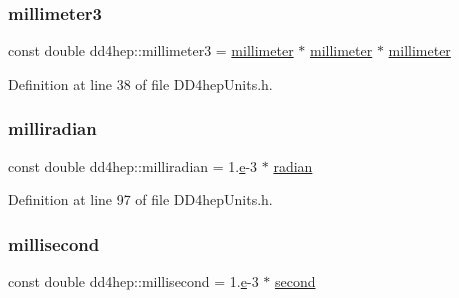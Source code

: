 \hypertarget{namespacedd4hep_a2ea09df717c3b153b6ea78fbd517fddc}{}\label{namespacedd4hep_a2ea09df717c3b153b6ea78fbd517fddc} 
\subsubsection{\texorpdfstring{millimeter3}{millimeter3}}
{\footnotesize\ttfamily const double dd4hep\+::millimeter3 = \hyperlink{namespacedd4hep_a1b3044c28560621f033b6f0fb9a15854}{millimeter} $\ast$ \hyperlink{namespacedd4hep_a1b3044c28560621f033b6f0fb9a15854}{millimeter} $\ast$ \hyperlink{namespacedd4hep_a1b3044c28560621f033b6f0fb9a15854}{millimeter}\hspace{0.3cm}{\ttfamily [static]}}



Definition at line 38 of file D\+D4hep\+Units.\+h.

\hypertarget{namespacedd4hep_a7502a4a65dcbf4395be335d0ba214a82}{}\label{namespacedd4hep_a7502a4a65dcbf4395be335d0ba214a82} 
\subsubsection{\texorpdfstring{milliradian}{milliradian}}
{\footnotesize\ttfamily const double dd4hep\+::milliradian = 1.\hyperlink{_volumes_8cpp_a8a9a1f93e9b09afccaec215310e64142}{e}-\/3 $\ast$ \hyperlink{namespacedd4hep_aa67a6662923dd0138a6bf6713eddcebb}{radian}\hspace{0.3cm}{\ttfamily [static]}}



Definition at line 97 of file D\+D4hep\+Units.\+h.

\hypertarget{namespacedd4hep_ac5b763830694c4ae41e03dc174f1cc79}{}\label{namespacedd4hep_ac5b763830694c4ae41e03dc174f1cc79} 
\subsubsection{\texorpdfstring{millisecond}{millisecond}}
{\footnotesize\ttfamily const double dd4hep\+::millisecond = 1.\hyperlink{_volumes_8cpp_a8a9a1f93e9b09afccaec215310e64142}{e}-\/3 $\ast$ \hyperlink{namespacedd4hep_ac03364576705a245265d8ed6ea26b871}{second}\hspace{0.3cm}{\ttfamily [static]}}



